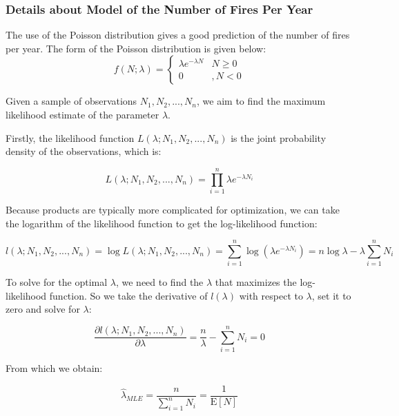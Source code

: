 \documentclass[12pt]{article}  %
\begin{document}
\subsubsection{Details about Model of the Number of Fires Per Year}
The use of the Poisson distribution gives a good prediction of the number of fires per year.\textsuperscript{\cite{poisson, firepossion}}
The form of the Poisson distribution is given below:
\begin{equation}
    f(N ; \lambda)=\left\{\begin{array}{cc}
        \lambda e^{-\lambda N} & N \geq 0 \\
        0 & , N<0
        \end{array}\right.
\end{equation}

Given a sample of observations $N_1, N_2, ..., N_n$, we aim to find the maximum likelihood estimate of the parameter $\lambda$.

Firstly, the likelihood function $L(\lambda; N_1, N_2, ..., N_n)$ is the joint probability density of the observations, which is:

\begin{equation}
L(\lambda; N_1, N_2, ..., N_n) = \prod_{i=1}^{n}\lambda e^{-\lambda N_i}
\end{equation}

Because products are typically more complicated for optimization, we can take the logarithm of the likelihood function to get the log-likelihood function:

\begin{equation}
l(\lambda; N_1, N_2, ..., N_n) = \log L(\lambda; N_1, N_2, ..., N_n) = \sum_{i=1}^{n} \log (\lambda e^{-\lambda N_i}) = n\log\lambda - \lambda \sum_{i=1}^{n} N_i
\end{equation}

To solve for the optimal $\lambda$, we need to find the $\lambda$ that maximizes the log-likelihood function. So we take the derivative of $l(\lambda)$ with respect to $\lambda$, set it to zero and solve for $\lambda$:

\begin{equation}
\frac{\partial l(\lambda; N_1, N_2, ..., N_n)}{\partial \lambda} = \frac{n}{\lambda} - \sum_{i=1}^{n} N_i = 0
\end{equation}

From which we obtain:

\begin{equation}
\hat{\lambda}_{MLE} = \frac{n}{\sum_{i=1}^{n} N_i} = \frac{1}{\text{E}[N]}
\end{equation}
\end{document}
